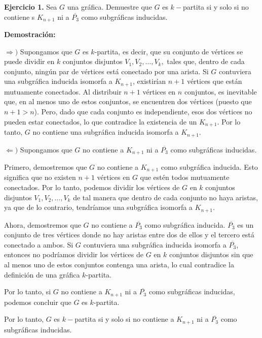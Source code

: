 \textbf{Ejercicio 1.} Sea $G$ una gráfica. Demuestre que $G$ es $k-$partita si y solo si 
no contiene s $K_{n+1}$ ni a $\overline{P_3}$ como subgráficas inducidas. 

\textbf{Demostración:}

$\Rightarrow)$ Supongamos que $G$ es $k$-partita, es decir, que su conjunto 
de vértices se puede dividir en $k$ conjuntos disjuntos $V_1, V_2, \dots, V_k,$ 
tales que, dentro de cada conjunto, ningún par de vértices está conectado por una arista.  
Si $G$ contuviera una subgráfica inducida isomorfa a $K_{n+1}$, existirían $n+1$ vértices 
que están mutuamente conectados. Al distribuir $n+1$ vértices en $n$ conjuntos, es 
inevitable que, en al menos uno de estos conjuntos, se encuentren dos vértices (puesto que $n+1 > n$). 
Pero, dado que cada conjunto es independiente, esos dos vértices no pueden estar conectados, 
lo que contradice la existencia de un $K_{n+1}$. Por lo tanto, $G$ no contiene una subgráfica 
inducida isomorfa a $K_{n+1}$.

$\Leftarrow)$ Supongamos que $G$ no contiene a $K_{n+1}$ ni a $\overline{P_3}$ como subgráficas inducidas. 

Primero, demostremos que $G$ no contiene a $K_{n+1}$ como subgráfica inducida. Esto significa que no existen $n+1$ vértices en $G$ que estén todos mutuamente conectados. Por lo tanto, podemos dividir los vértices de $G$ en $k$ conjuntos disjuntos $V_1, V_2, \dots, V_k$ de tal manera que dentro de cada conjunto no haya aristas, ya que de lo contrario, tendríamos una subgráfica isomorfa a $K_{n+1}$.

Ahora, demostremos que $G$ no contiene a $\overline{P_3}$ como subgráfica inducida. $\overline{P_3}$ es un conjunto de tres vértices donde no hay aristas entre dos de ellos y el tercero está conectado a ambos. Si $G$ contuviera una subgráfica inducida isomorfa a $\overline{P_3}$, entonces no podríamos dividir los vértices de $G$ en $k$ conjuntos disjuntos sin que al menos uno de estos conjuntos contenga una arista, lo cual contradice la definición de una gráfica $k$-partita.

Por lo tanto, si $G$ no contiene a $K_{n+1}$ ni a $\overline{P_3}$ como subgráficas inducidas, podemos concluir que $G$ es $k$-partita.

Por lo tanto, $G$ es $k-$partita si y solo si no contiene a $K_{n+1}$ ni a $\overline{P_3}$ como 
subgráficas inducidas. 

\QED